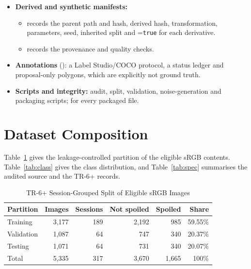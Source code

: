 \documentclass[journal]{IEEEtran}
\begin{document}
\begin{itemize}
\begin{itemize}
    \item[--] ,  and \texttt{seed}.
  \end{itemize}
  A day-grouped sensitivity split uses the same schema.
  \item \textbf{Derived and synthetic manifests:}
  \begin{itemize}
    \item[--]  records the parent path and hash, derived hash, transformation, parameters, seed, inherited split and =\texttt{true} for each derivative.
    \item[--]  records the provenance  and quality checks.
  \end{itemize}
  \item \textbf{Annotations} (): a Label Studio/COCO protocol, a status ledger and proposal-only polygons, which are explicitly not ground truth.
  \item \textbf{Scripts and integrity:} audit, split, validation, noise-generation and packaging scripts;  for every packaged file.
\end{itemize}

\section{Dataset Composition}
Table~\ref{tab:split} gives the leakage-controlled partition of the eligible sRGB contents. Table~\ref{tab:class} gives the class distribution, and Table~\ref{tab:spec} summarises the audited source and the TR-6+ records.

\begin{table}[!t]
\caption{TR-6+ Session-Grouped Split of Eligible sRGB Images}
\label{tab:split}
\centering
\footnotesize
\begin{tabular}{@{}lrrrrr@{}}
\toprule
Partition & Images & Sessions & Not spoiled & Spoiled & Share \\
\midrule
Training   & 3,177 & 189 & 2,192 & 985 & 59.55\% \\
Validation & 1,087 &  64 &   747 & 340 & 20.37\% \\
Testing    & 1,071 &  64 &   731 & 340 & 20.07\% \\
\midrule
Total      & 5,335 & 317 & 3,670 & 1,665 & 100\% \\
\bottomrule
\end{tabular}
\end{table}
\end{document}
